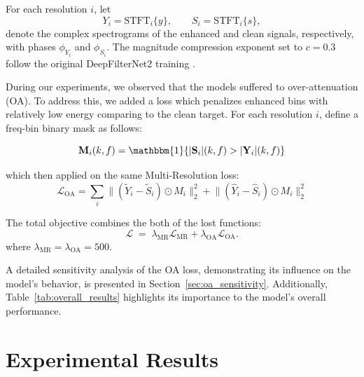 \documentclass[final,5p,times,authoryear]{elsarticle}
\begin{document}
For each resolution $i$, let
\[
Y_i=\mathrm{STFT}_i\{y\},\qquad S_i=\mathrm{STFT}_i\{s\},
\]
denote the complex spectrograms of the enhanced and clean signals, respectively, with phases \(\phi_{Y_i}\) and \(\phi_{S_i}\). The magnitude compression exponent set to $c=0.3$ follow the original DeepFilterNet2 training \citep{DeepFilterNet2}.

During our experiments, we observed that the models suffered to over-attenuation (OA). To address this, we added a loss which penalizes enhanced bins with relatively low energy comparing to the clean target. For each resolution $i$, define a freq-bin binary mask as follows:

\begin{equation}
\mathbf{M}_i(k,f)=\mathbbm{1}\!\left\{ \lvert \mathbf{S}_i\rvert(k,f) > \lvert \mathbf{Y}_i\rvert(k,f) \right\}
\end{equation}

which then applied on the same Multi-Resolution loss:
\begin{equation}
\mathcal{L}_{\mathrm{OA}}
= \sum_{i} \Big\| (\widetilde{Y}_i - \widetilde{S}_i) \odot M_i \Big\|_2^{2}
+
\Big\| (\widehat{Y}_i - \widehat{S}_i) \odot M_i \Big\|_2^{2}
\end{equation}

The total objective combines the both of the lost functions:
\begin{equation}
\mathcal{L} \;=\; \lambda_{\mathrm{MR}}\mathcal{L}_{\mathrm{MR}}+\lambda_{\mathrm{OA}}\mathcal{L}_{\mathrm{OA}} .
\end{equation}
where $\lambda_{\mathrm{MR}} = \lambda_{\mathrm{OA}} = 500$.


A detailed sensitivity analysis of the OA loss, demonstrating its influence on the model’s behavior, is presented in Section~\ref{sec:oa_sensitivity}. Additionally, Table~\ref{tab:overall_results} highlights its importance to the model’s overall performance.


\section{Experimental Results}
\label{sec:experimental_results}
\end{document}
